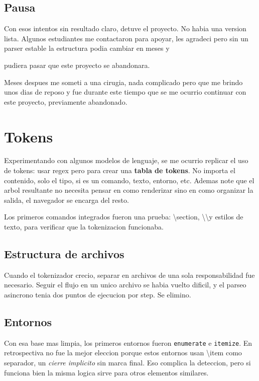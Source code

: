 \documentclass{article}
\begin{document}
\section{ Pausa }

Con esos intentos sin resultado claro, detuve el proyecto. No habia una version
 lista.
Algunos estudiantes me contactaron para apoyar, les agradeci pero sin un
parser estable la estructura podia cambiar en meses y

\alert{ pudiera pasar que este proyecto se abandonara. }

Meses despues me someti a una cirugia, nada complicado pero que me brindo unos
dias de reposo y fue durante este tiempo que se me ocurrio continuar con este
proyecto, previamente abandonado.



  \chapter{ Tokens }

  Experimentando con algunos modelos de lenguaje, se me ocurrio replicar el uso
  de tokens: usar regex pero para crear una \textbf{tabla de tokens}. No importa
  el contenido, solo el tipo, si es un comando, texto, entorno, etc. Ademas note
  que el arbol resultante no necesita pensar en como renderizar sino en como
  organizar la salida, el navegador se encarga del resto.

  Los primeros comandos integrados fueron una prueba: \backslash section,
  \backslash\backslash y estilos de texto, para verificar que la tokenizacion
  funcionaba.

  \section{ Estructura de archivos }

  Cuando el tokenizador crecio, separar en archivos de una sola responsabilidad
  fue necesario. Seguir el flujo en un unico archivo se habia vuelto dificil,
  y el parseo asincrono tenia dos puntos de ejecucion por step. Se elimino.

  \section{ Entornos }

  Con esa base mas limpia, los primeros entornos fueron \texttt{enumerate}
  e \texttt{itemize}. En retrospectiva no fue la mejor eleccion porque estos
  entornos usan \backslash item como separador, un \textit{cierre implicito}
  sin marca final. Eso complica la deteccion, pero si funciona bien la
  misma logica sirve para otros elementos similares.
\end{document}
